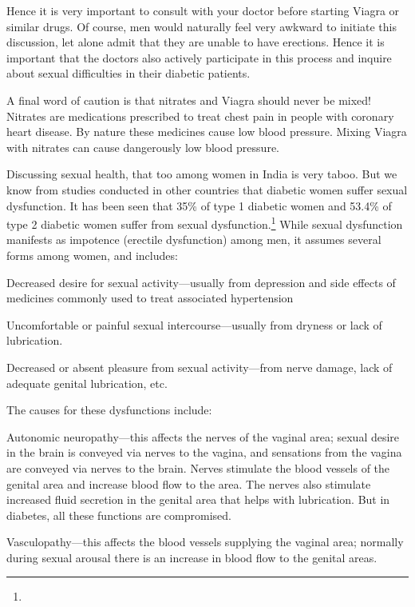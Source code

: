 Hence it is very important to consult with your doctor before starting Viagra or similar drugs. Of course, men would naturally feel very awkward to initiate this discussion, let alone admit that they are unable to have erections. Hence it is important that the doctors also actively participate in this process and inquire about sexual difficulties in their diabetic patients.

A final word of caution is that nitrates and Viagra should never be mixed! Nitrates are medications prescribed to treat chest pain in people with coronary heart disease. By nature these medicines cause low blood pressure. Mixing Viagra with nitrates can cause dangerously low blood pressure.


Discussing sexual health, that too among women in India is very taboo. But we know from studies conducted in other countries that diabetic women suffer sexual dysfunction. It has been seen that 35\% of type 1 diabetic women and 53.4\% of type 2 diabetic women suffer from sexual dysfunction.\footnote{} While sexual dysfunction manifests as impotence (erectile dysfunction) among men, it assumes several forms among women, and includes:

\item Decreased desire for sexual activity—usually from depression and side effects of medicines commonly used to treat associated hypertension

 \item Uncomfortable or painful sexual intercourse—usually from dryness or lack of lubrication.

 \item Decreased or absent pleasure from sexual activity—from nerve damage, lack of adequate genital lubrication, etc.

The causes for these dysfunctions include:

\item Autonomic neuropathy—this affects the nerves of the vaginal area; sexual desire in the brain is conveyed via nerves to the vagina, and sensations from the vagina are conveyed via nerves to the brain. Nerves stimulate the blood vessels of the genital area and increase blood flow to the area. The nerves also stimulate increased fluid secretion in the genital area that helps with lubrication. But in diabetes, all these functions are compromised.

 \item Vasculopathy—this affects the blood vessels supplying the vaginal area; normally during sexual arousal there is an increase in blood flow to the genital areas.

